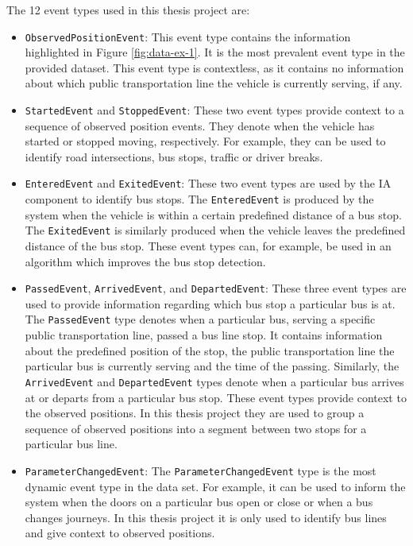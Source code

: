 The 12 event types used in this thesis project are:
\begin{itemize}
    \item \texttt{ObservedPositionEvent}:
    This event type contains the information highlighted in Figure \ref{fig:data-ex-1}.
    It is the most prevalent event type in the provided dataset.
    This event type is contextless, as it contains no information about which public transportation line the vehicle is currently serving, if any. 
    
    \item \texttt{StartedEvent} and \texttt{StoppedEvent}:
    These two event types provide context to a sequence of observed position events.
    They denote when the vehicle has started or stopped moving, respectively.
    For example, they can be used to identify road intersections, bus stops, traffic or driver breaks.
    
    \item \texttt{EnteredEvent} and \texttt{ExitedEvent}:
    These two event types are used by the IA component to identify bus stops.
    The \texttt{EnteredEvent} is produced by the system when the vehicle is within a certain predefined distance of a bus stop.
    The \texttt{ExitedEvent} is similarly produced when the vehicle leaves the predefined distance of the bus stop.
    These event types can, for example, be used in an algorithm which improves the bus stop detection.
    
    \item \texttt{PassedEvent}, \texttt{ArrivedEvent}, and \texttt{DepartedEvent}:
    These three event types are used to provide information regarding which bus stop a particular bus is at.
    The \texttt{PassedEvent} type denotes when a particular bus, serving a specific public transportation line, passed a bus line stop.
    It contains information about the predefined position of the stop, the public transportation line the particular bus is currently serving and the time of the passing.
    Similarly, the \texttt{ArrivedEvent} and \texttt{DepartedEvent} types denote when a particular bus arrives at or departs from a particular bus stop.
    These event types provide context to the observed positions.
    In this thesis project they are used to group a sequence of observed positions into a segment between two stops for a particular bus line.
    
    \item \texttt{ParameterChangedEvent}:  
    The \texttt{ParameterChangedEvent} type is the most dynamic event type in the data set.
    For example, it can be used to inform the system when the doors on a particular bus open or close or when a bus changes journeys.
    In this thesis project it is only used to identify bus lines and give context to observed positions.
    

\end{itemize}

